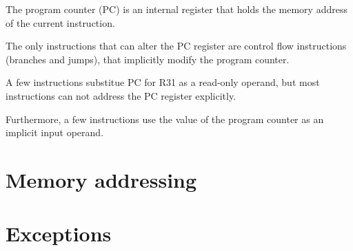 The program counter (PC) is an internal register that holds the memory address
of the current instruction.

The only instructions that can alter the PC register are control flow
instructions (branches and jumps), that implicitly modify the program counter.

A few instructions substitue PC for R31 as a read-only operand, but most
instructions can not address the PC register explicitly.

Furthermore, a few instructions use the value of the program counter as an
implicit input operand.

\section{Memory addressing}

\tbd

\section{Exceptions}

\tbd
